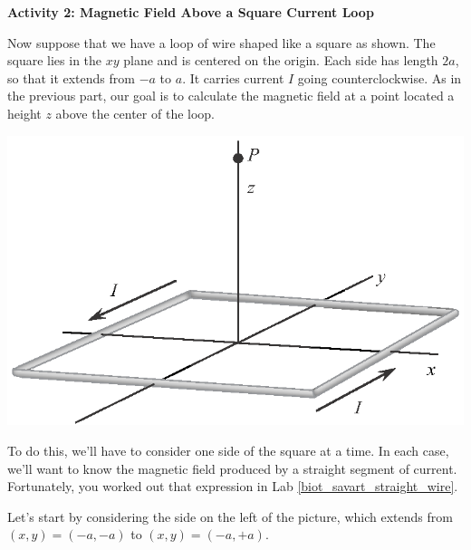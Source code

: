 \bigskip

{\bf Activity 2: Magnetic Field Above a Square Current Loop}

Now suppose that we have a loop of wire shaped like a square as shown.
The square lies in the $xy$ plane and is centered on the origin.
Each side has length $2a$, so that it extends from $-a$ to $a$.
It carries current $I$ going counterclockwise.  As in the previous
part, our goal is to calculate the magnetic field at a point 
located a height $z$ above the center of the loop.  

\vspace{0.4in}
\centerline{\includegraphics{biot_savart_above_loops/square_loop_3d.eps}}
\medskip


To do this, we'll have to consider one side of the square at a time.  In
each case, we'll want to know the magnetic field produced by 
a straight segment of current.  Fortunately, you worked out
that expression in Lab \ref{biot_savart_straight_wire}. 


Let's start by considering 
the side on the left of the picture, which extends from
$(x,y)=(-a,-a)$ to $(x,y)=(-a,+a)$.

